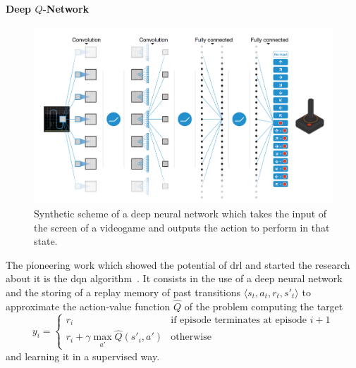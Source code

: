 \paragraph{Deep $Q$-Network}\label{S:dqn}
\begin{figure}[t]
\begin{minipage}{\textwidth}
\begin{center}
  \includegraphics[scale=.19]{img/dqn.png}
\end{center}
\end{minipage}
\caption[DQN network scheme]{Synthetic scheme of a deep neural network which takes the input of the screen of a videogame and outputs the action to perform in that state.}
\end{figure}
The pioneering work which showed the potential of \gls{drl} and started the research about it is the \gls{dqn} algorithm~\cite{mnih2015human}. It consists in the use of a deep neural network and the storing of a replay memory of past transitions $\langle s_t, a_t, r_t, s'_t \rangle$ to approximate the action-value function $\hat{Q}$ of the problem computing the target
\begin{equation}\label{E:dqn_update}
y_i=
    \begin{cases}
    r_i & \text{if episode terminates at episode }i+1\\
    r_i + \gamma \max_{a'} \hat{Q}(s'_i, a') & \text{otherwise}
    \end{cases}
\end{equation}
and learning it in a supervised way.

